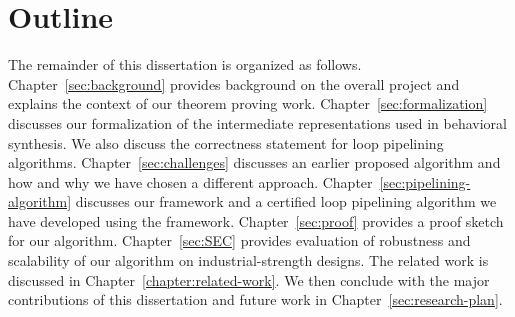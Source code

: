 \section {Outline}
The remainder of this dissertation is organized as
follows. Chapter~\ref{sec:background} provides background on the overall project and 
explains the context of our theorem proving work. Chapter~\ref{sec:formalization} 
discusses our formalization of the intermediate representations used in behavioral synthesis.
We also discuss the correctness statement for loop pipelining algorithms. Chapter~\ref{sec:challenges} 
discusses an earlier proposed algorithm and how and why we have chosen a different approach.
Chapter~\ref{sec:pipelining-algorithm} discusses our framework and a certified loop pipelining 
algorithm we have developed using the framework. Chapter~\ref{sec:proof} provides a proof 
sketch for our algorithm. Chapter~\ref{sec:SEC} provides evaluation of robustness and 
scalability of our algorithm on industrial-strength designs. The related work is discussed in Chapter~\ref{chapter:related-work}.
We then conclude with the major 
contributions of this dissertation and future work in Chapter~\ref{sec:research-plan}.
